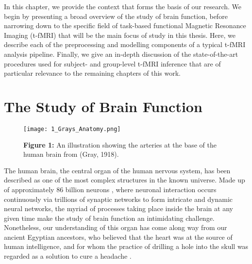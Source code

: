 In this chapter, we provide the context that forms the basis of our research. We begin by presenting a broad overview of the study of brain function, before narrowing down to the specific field of task-based functional Magnetic Resonance Imaging (t-fMRI) that will be the main focus of study in this thesis. Here, we describe each of the preprocessing and modelling components of a typical t-fMRI analysis pipeline. Finally, we give an in-depth discussion of the state-of-the-art procedures used for subject- and group-level t-fMRI inference that are of particular relevance to the remaining chapters of this work. 

\pagebreak

\section{The Study of Brain Function}

\begin{figure}[htbp]
\centering
	\texttt{[image: 1\_Grays\_Anatomy.png]}	
\caption*{\textbf{Figure 1:} An illustration showing the arteries at the base of the human brain from (Gray, 1918).}
\end{figure}

The human brain, the central organ of the human nervous system, has been described as one of the most complex structures in the known universe. Made up of approximately 86 billion neurons \citep{Azevedo2009-qj}, where neuronal interaction occurs continuously via trillions of synaptic networks to form intricate and dynamic neural networks, the myriad of processes taking place inside the brain at any given time make the study of brain function an intimidating challenge. Nonetheless, our understanding of this organ has come along way from our ancient Egyptian ancestors, who believed that the heart was at the source of human intelligence, and for whom the practice of drilling a hole into the skull was regarded as a solution to cure a headache \citep{Adelman1987-hs, Mohamed2014-gl}. 

